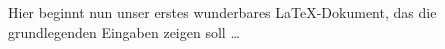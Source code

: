 \documentclass[10pt, a4paper]{article}
\begin{document}
 Hier beginnt nun unser erstes wunderbares LaTeX-Dokument,
 das die grundlegenden Eingaben zeigen soll \dots
 
\end{document}

